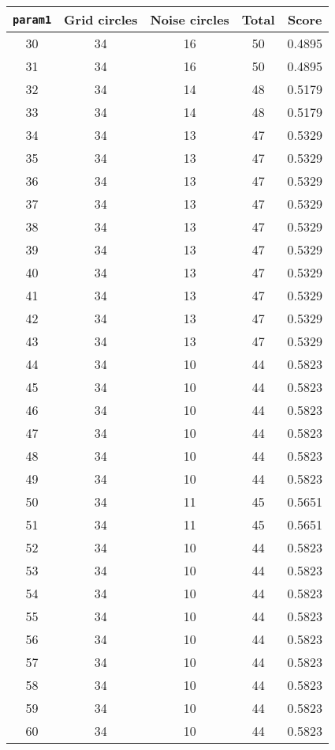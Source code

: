 \documentclass[letterpaper, 12pt]{article}
\begin{document}
\begin{longtable}{|c|c|c|c|c|}
\hline
\textbf{\texttt{param1}} & \textbf{Grid circles} & \textbf{Noise circles} & \textbf{Total} & \textbf{Score} \\
\hline
30 & 34 & 16 & 50 & 0.4895 \\
\hline
31 & 34 & 16 & 50 & 0.4895 \\
\hline
32 & 34 & 14 & 48 & 0.5179 \\
\hline
33 & 34 & 14 & 48 & 0.5179 \\
\hline
34 & 34 & 13 & 47 & 0.5329 \\
\hline
35 & 34 & 13 & 47 & 0.5329 \\
\hline
36 & 34 & 13 & 47 & 0.5329 \\
\hline
37 & 34 & 13 & 47 & 0.5329 \\
\hline
38 & 34 & 13 & 47 & 0.5329 \\
\hline
39 & 34 & 13 & 47 & 0.5329 \\
\hline
40 & 34 & 13 & 47 & 0.5329 \\
\hline
41 & 34 & 13 & 47 & 0.5329 \\
\hline
42 & 34 & 13 & 47 & 0.5329 \\
\hline
43 & 34 & 13 & 47 & 0.5329 \\
\hline
44 & 34 & 10 & 44 & 0.5823 \\
\hline
45 & 34 & 10 & 44 & 0.5823 \\
\hline
46 & 34 & 10 & 44 & 0.5823 \\
\hline
47 & 34 & 10 & 44 & 0.5823 \\
\hline
48 & 34 & 10 & 44 & 0.5823 \\
\hline
49 & 34 & 10 & 44 & 0.5823 \\
\hline
50 & 34 & 11 & 45 & 0.5651 \\
\hline
51 & 34 & 11 & 45 & 0.5651 \\
\hline
52 & 34 & 10 & 44 & 0.5823 \\
\hline
53 & 34 & 10 & 44 & 0.5823 \\
\hline
54 & 34 & 10 & 44 & 0.5823 \\
\hline
55 & 34 & 10 & 44 & 0.5823 \\
\hline
56 & 34 & 10 & 44 & 0.5823 \\
\hline
57 & 34 & 10 & 44 & 0.5823 \\
\hline
58 & 34 & 10 & 44 & 0.5823 \\
\hline
59 & 34 & 10 & 44 & 0.5823 \\
\hline
60 & 34 & 10 & 44 & 0.5823 \\

\end{longtable}
\end{document}
